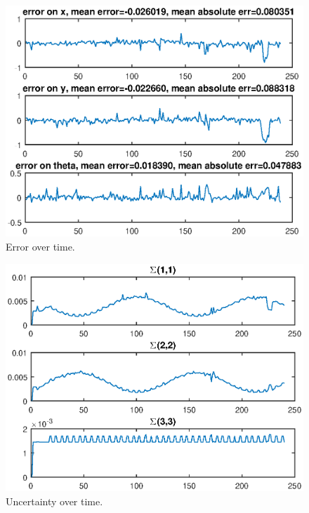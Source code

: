 \documentclass[12pt]{article}
\begin{document}
\begin{figure}[htbp]
 \centering
 \includegraphics[width=\textwidth]{test4_fig2}
 \caption{Error over time.}
\end{figure}
\begin{figure}[htbp]
 \centering
 \includegraphics[width=\textwidth]{test4_fig3}
 \caption{Uncertainty over time.}
\end{figure}








%
%
\end{document}
